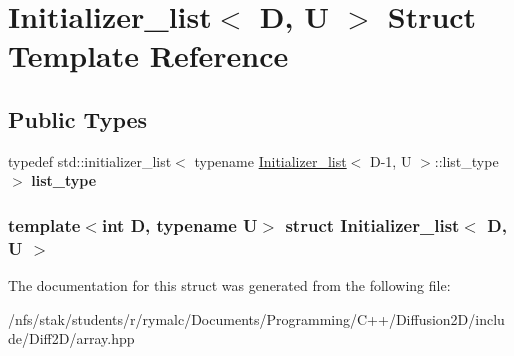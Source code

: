 \hypertarget{structInitializer__list}{
\section{Initializer\_\-list$<$ D, U $>$ Struct Template Reference}
\label{structInitializer__list}
}
\subsection*{Public Types}
\begin{DoxyCompactItemize}
\item 
\hypertarget{structInitializer__list_ae28944fda227672ee3e7bac608a7b30a}{
typedef std::initializer\_\-list$<$ typename \hyperlink{structInitializer__list}{Initializer\_\-list}$<$ D-\/1, U $>$::list\_\-type $>$ {\bfseries list\_\-type}}
\label{structInitializer__list_ae28944fda227672ee3e7bac608a7b30a}

\end{DoxyCompactItemize}
\subsubsection*{template$<$int D, typename U$>$ struct Initializer\_\-list$<$ D, U $>$}



The documentation for this struct was generated from the following file:\begin{DoxyCompactItemize}
\item 
/nfs/stak/students/r/rymalc/Documents/Programming/C++/Diffusion2D/include/Diff2D/array.hpp\end{DoxyCompactItemize}
